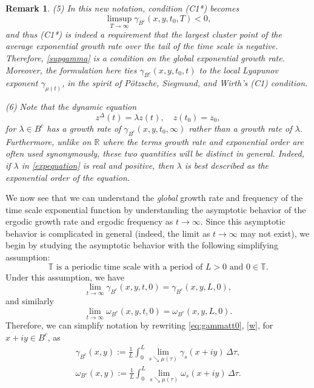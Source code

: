 \documentclass[10pt,a4paper]{amsart}
\numberwithin{equation}{section}
\newtheorem{remark}[theorem]{Remark}
\begin{document}
\begin{remark}
(5) In this new notation, condition (C1*) becomes
 \begin{equation} \label{supgamma}
 \limsup_{T \to \infty} \gamma_{B^c}(x,y,t_0,T) < 0,
 \end{equation}
and thus (C1*) is indeed a requirement that the largest cluster point of the average
exponential growth rate over the tail of the time scale is negative.
Therefore, \eqref{supgamma} is a condition on the \emph{global} exponential growth rate.
 Moreover, the formulation here ties $\gamma_{B^c}(x,y,t_0,t)$ to the local Lyapunov
 exponent $\gamma_{\mu(t)}$, in the spirit of P\"otzsche, Siegmund, and Wirth's
 (C1) condition.

(6) Note that the dynamic equation
\begin{equation}
z^{\Delta}(t)=\lambda z(t), \quad z(t_0)=z_0,
\label{expequation}
\end{equation}
for $\lambda \in B^c$ has a growth rate of $\gamma_{B^c}(x,y,t_0,\infty)$ rather than a growth rate of $\lambda$. Furthermore, unlike on $\mathbb{R}$ where the terms \emph{growth rate} and \emph{exponential order} are often used synonymously, these two quantities will be distinct in general. Indeed, if $\lambda$ in \eqref{expequation} is real and positive, then $\lambda$ is best described as the \emph{exponential order} of the equation.
 \end{remark}

We now see that we can understand the \emph{global} growth rate and frequency of the
time scale exponential function by understanding the asymptotic behavior of the
ergodic growth rate and ergodic frequency as $t\to\infty$.
 Since this asymptotic behavior is complicated in general (indeed, the limit as
$t\to\infty$ may not exist), we begin by studying the asymptotic behavior with the
following simplifying assumption:
\begin{equation}
\mathbb{T} \text{ is a periodic time scale with a period of } L>0
\text{ and }0 \in \mathbb{T}.
\tag{P}
\label{P}
\end{equation}
Under this assumption, we have
\[
\lim_{t \to \infty} \gamma_{B^c}(x,y,t,0) = \gamma_{B^c}(x,y,L,0),
\]
and similarly
\[
\lim_{t \to \infty} \omega_{B^c}(x,y,t,0) = \omega_{B^c}(x,y,L,0).
\]
Therefore, we can simplify notation by rewriting \eqref{eq:gammatt0}, \eqref{w},
for $x+iy \in B^c$, as
\begin{gather}
 \gamma_{B^c}(x,y) :=\frac{1}{L}\int_0^{L} \lim_{s \searrow
\mu(\tau)} \gamma_s(x+iy)\,\Delta \tau, \label{g21} \\
\omega_{B^c}(x,y) := \frac{1}{L}\int_{0}^{L} \lim_{s \searrow
\mu(\tau)} \omega_s(x+iy)\,\Delta \tau.\label{w1}
\end{gather}
\end{document}
